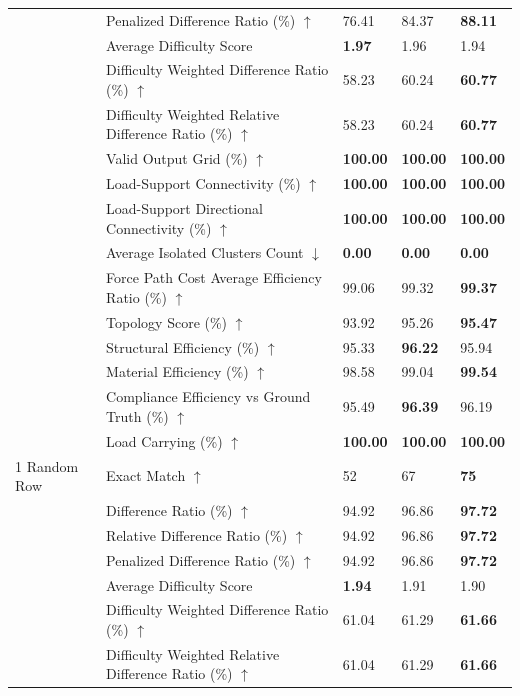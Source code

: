 \begin{table}[!h]
{\begin{tabular}{lllll}
 & Penalized Difference Ratio (\%) $\uparrow$ & 76.41 & 84.37 & \textbf{88.11} \\
 & Average Difficulty Score & \textbf{1.97} & 1.96 & 1.94 \\
 & Difficulty Weighted Difference Ratio (\%) $\uparrow$ & 58.23 & 60.24 & \textbf{60.77} \\
 & Difficulty Weighted Relative Difference Ratio (\%) $\uparrow$ & 58.23 & 60.24 & \textbf{60.77} \\
 & Valid Output Grid (\%) $\uparrow$ & \textbf{100.00} & \textbf{100.00} & \textbf{100.00} \\
 & Load-Support Connectivity (\%) $\uparrow$ & \textbf{100.00} & \textbf{100.00} & \textbf{100.00} \\
 & Load-Support Directional Connectivity (\%) $\uparrow$ & \textbf{100.00} & \textbf{100.00} & \textbf{100.00} \\
 & Average Isolated Clusters Count $\downarrow$ & \textbf{0.00} & \textbf{0.00} & \textbf{0.00} \\
 & Force Path Cost Average Efficiency Ratio (\%) $\uparrow$ & 99.06 & 99.32 & \textbf{99.37} \\
 & Topology Score (\%) $\uparrow$ & 93.92 & 95.26 & \textbf{95.47} \\
 & Structural Efficiency (\%) $\uparrow$ & 95.33 & \textbf{96.22} & 95.94 \\
 & Material Efficiency (\%) $\uparrow$ & 98.58 & 99.04 & \textbf{99.54} \\
 & Compliance Efficiency vs Ground Truth (\%) $\uparrow$ & 95.49 & \textbf{96.39} & 96.19 \\
 & Load Carrying (\%) $\uparrow$ & \textbf{100.00} & \textbf{100.00} & \textbf{100.00} \\
1 Random Row & Exact Match $\uparrow$ & 52 & 67 & \textbf{75} \\
 & Difference Ratio (\%) $\uparrow$ & 94.92 & 96.86 & \textbf{97.72} \\
 & Relative Difference Ratio (\%) $\uparrow$ & 94.92 & 96.86 & \textbf{97.72} \\
 & Penalized Difference Ratio (\%) $\uparrow$ & 94.92 & 96.86 & \textbf{97.72} \\
 & Average Difficulty Score & \textbf{1.94} & 1.91 & 1.90 \\
 & Difficulty Weighted Difference Ratio (\%) $\uparrow$ & 61.04 & 61.29 & \textbf{61.66} \\
 & Difficulty Weighted Relative Difference Ratio (\%) $\uparrow$ & 61.04 & 61.29 & \textbf{61.66} \\

\end{tabular}}
\end{table}
